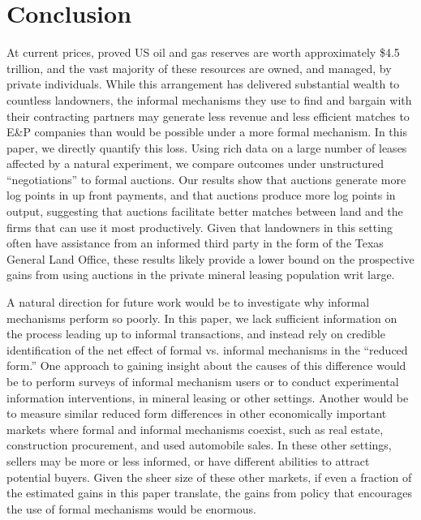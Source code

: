 \section{Conclusion}\label{sec:Conclusion}

At current prices, proved US oil and gas reserves are worth approximately \$4.5 trillion, and the vast majority of these resources are owned, and managed, by private individuals.  While this arrangement has delivered substantial wealth to countless landowners, the informal mechanisms they use to find and bargain with their contracting partners may generate less revenue and less efficient matches to E\&P companies than would be possible under a more formal mechanism.  In this paper, we directly quantify this loss.  Using rich data on a large number of leases affected by a natural experiment, we compare outcomes under unstructured ``negotiations'' to formal auctions.  Our results show that auctions generate  more log points in up front payments, and that auctions produce  more log points in output, suggesting that auctions facilitate better matches between land and the firms that can use it most productively. Given that landowners in this setting often have assistance from an informed third party in the form of the Texas General Land Office, these results likely provide a lower bound on the prospective gains from using auctions in the private mineral leasing population writ large. 

A natural direction for future work would be to investigate why informal mechanisms perform so poorly. In this paper, we lack sufficient information on the process leading up to informal transactions, and instead rely on credible identification of the net effect of formal vs. informal mechanisms in the ``reduced form.''  One approach to gaining insight about the causes of this difference would be to perform surveys of informal mechanism users or to conduct experimental information interventions, in mineral leasing or other settings.  Another would be to measure similar reduced form differences in other economically important markets where formal and informal mechanisms coexist, such as real estate, construction procurement, and used automobile sales. In these other settings, sellers may be more or less informed, or have different abilities to attract potential buyers. Given the sheer size of these other markets, if even a fraction of the estimated gains in this paper translate, the gains from policy that encourages the use of formal mechanisms would be enormous.  

\singlespace


